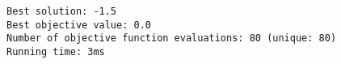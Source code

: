 \verb$Best solution: -1.5                                      $\\
\verb$Best objective value: 0.0                                $\\
\verb$Number of objective function evaluations: 80 (unique: 80)$\\
\verb$Running time: 3ms                                        $\\